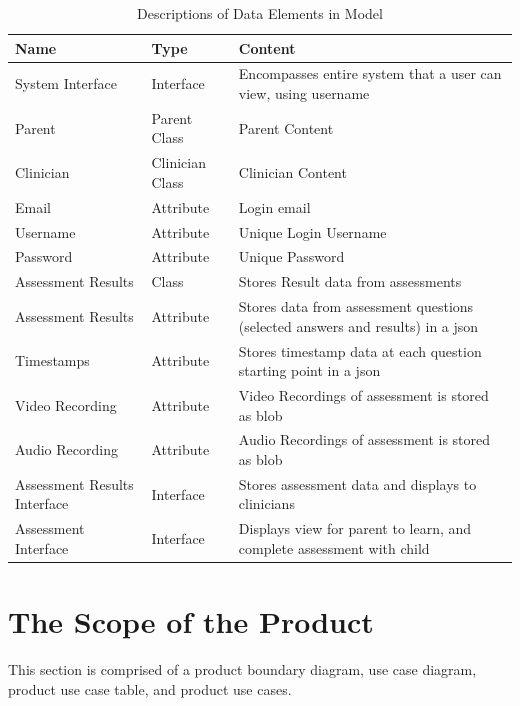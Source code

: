 \documentclass[12pt]{article}
\begin{document}
\begin{table}[h!]
  \caption{Descriptions of Data Elements in Model}
  \label{tab:data_dictionary}
\begin{tabularx}{\textwidth}{p{2.5cm}p{3cm}X}
  \toprule {\textbf{Name}} & {\textbf{Type}} & {\textbf{Content}}\\
  \midrule
  System Interface & Interface & Encompasses entire system that a user can view, using username \\ 
  \hline 
  Parent & Parent Class & Parent Content \\ 
  \hline
  Clinician & Clinician Class & Clinician Content \\ 
  \hline 
  Email & Attribute & Login email \\
  \hline 
  Username & Attribute & Unique Login Username \\
  \hline 
  Password & Attribute & Unique Password \\
  \hline 
  Assessment Results & Class & Stores Result data from assessments \\
  \hline 
  Assessment Results & Attribute & Stores data from assessment questions (selected answers and results) in a json \\
  \hline 
  Timestamps & Attribute & Stores timestamp data at each question starting point in a json \\
  \hline 
  Video Recording & Attribute & Video Recordings of assessment is stored as blob \\
  \hline 
  Audio Recording & Attribute & Audio Recordings of assessment is stored as blob \\
  \hline 
  Assessment Results Interface & Interface & Stores assessment data and displays to clinicians \\ 
  \hline 
  Assessment Interface & Interface & Displays view for parent to learn, and complete assessment with child \\
  \bottomrule
  \end{tabularx}
\end{table}

\newpage

\section{The Scope of the Product}
\hspace{2em}This section is comprised of a product boundary diagram, use case diagram, product use case table, and product use cases.
\end{document}
